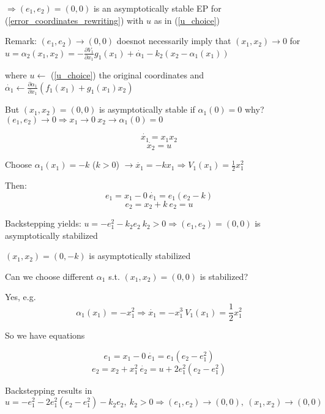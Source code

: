 $\Rightarrow (e_1, e_2) = (0,0)$ is an asymptotically stable EP for (\ref{error_coordinates_rewriting}) with $u$ as in (\ref{u_choice}) 

Remark: $(e_1, e_2) \to (0,0)$ doesnot necessarily imply that $(x_1, x_2) \to 0$ for $u = \alpha_2(x_1, x_2) = - \frac{\partial V_1}{\partial x_1}g_1(x_1) + \dot{\alpha_1} - k_2(x_2 - \alpha_1(x_1))$

where $u \leftarrow$ (\ref{u_choice}) the original coordinates and $\dot{\alpha_1} \leftarrow \frac{\partial \alpha_1}{\partial x_1}(f_1(x_1) + g_1(x_1)x_2)$

But $(x_1, x_2) = (0,0)$ is asymptotically stable if $\alpha_1(0) = 0$ why? $(e_1,e_2) \to 0 \Rightarrow x_1 \to 0 \ x_2 \to \alpha_1(0) = 0$

\begin{Example}
\begin{equation*}
\dot{x_1} = x_1x_2
\end{equation*}
\begin{equation*}
\dot{x_2} = u
\end{equation*}

Choose $\alpha_1(x_1) = -k$ ($k > 0$) $\rightarrow \dot{x_1} = -k x_1 \Rightarrow V_1(x_1) = \frac{1}{2}x_1^2$

Then: 
\begin{equation*}
e_1 = x_1 - 0 \ \dot{e_1} = e_1(e_2 - k)
\end{equation*}
\begin{equation*}
e_2 = x_2 + k \ e_2 = u
\end{equation*}

Backstepping yields: $u = - e_1^2 - k_2e_2 \ k_2 > 0 \Rightarrow (e_1,e_2) = (0,0)$ is asymptotically stabilized

$(x_1, x_2) = (0,-k)$ is asymptotically stabilized

Can we choose different $\alpha_1$ s.t. $(x_1, x_2) = (0,0)$ is stabilized?

Yes, e.g.
\begin{equation*}
\alpha_1(x_1) = -x_1^2 \Rightarrow \dot{x_1} = - x_1^3 \ V_1(x_1) = \frac{1}{2}x_1^2
\end{equation*}

So we have equations

\begin{equation*}
e_1 = x_1 - 0 \ \dot{e_1}  = e_1(e_2 - e_1^2) 
\end{equation*}
\begin{equation*}
e_2 = x_2 + x_1^2 \ \dot{e_2} = u + 2e_1^2(e_2 - e_1^2)
\end{equation*}

Backstepping results in 
\begin{equation*}
u = -e_1^2 - 2e_1^2(e_2 - e_1^2) - k_2e_2, \ k_2 > 0 \Rightarrow (e_1,e_2) \to (0,0), \ (x_1, x_2) \to (0,0)
\end{equation*}
\end{Example}

